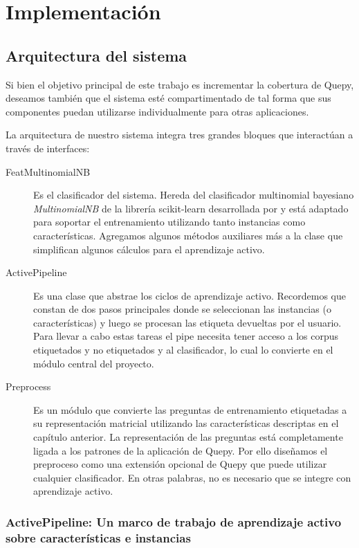 \chapter{Implementación}

\section{Arquitectura del sistema}
Si bien el objetivo principal de este trabajo es incrementar la cobertura de Quepy, deseamos también que el sistema esté compartimentado de tal forma que sus componentes puedan utilizarse individualmente para otras aplicaciones.

La arquitectura de nuestro sistema integra tres grandes bloques que interactúan a través de interfaces:

\begin{description}
    \item[FeatMultinomialNB] Es el clasificador del sistema. Hereda del clasificador multinomial bayesiano \textit{MultinomialNB} de la librería scikit-learn desarrollada por \citet{scikit-learn} y está adaptado para soportar el entrenamiento utilizando tanto instancias como características. Agregamos algunos métodos auxiliares más a la clase que simplifican algunos cálculos para el aprendizaje activo.
    \item[ActivePipeline] Es una clase que abstrae los ciclos de aprendizaje activo. Recordemos que constan de dos pasos principales donde se seleccionan las instancias (o características) y luego se procesan las etiqueta devueltas por el usuario. Para llevar a cabo estas tareas el pipe necesita tener acceso a los corpus etiquetados y no etiquetados y al clasificador, lo cual lo convierte en el módulo central del proyecto.
    \item[Preprocess] Es un módulo que convierte las preguntas de entrenamiento etiquetadas a su representación matricial utilizando las características descriptas en el capítulo anterior. La representación de las preguntas está completamente ligada a los patrones de la aplicación de Quepy. Por ello diseñamos el preproceso como una extensión opcional de Quepy que puede utilizar cualquier clasificador. En otras palabras, no es necesario que se integre con aprendizaje activo.
\end{description}

\subsection{ActivePipeline: Un marco de trabajo de aprendizaje activo sobre características e instancias}

